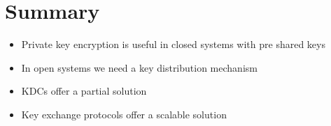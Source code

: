 \section{Summary}
	\begin{itemize}
		\item Private key encryption is useful in closed systems with pre shared keys
		\item In open systems we need a key distribution mechanism
		\item KDCs offer a partial solution
		\item Key exchange protocols offer a scalable solution
	\end{itemize}























